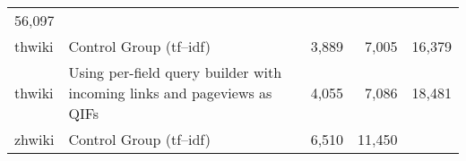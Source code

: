 \documentclass[12pt,]{article}
\begin{document}
\begin{longtable}[]{@{}llrrr@{}}
\begin{minipage}[t]{0.11\columnwidth}
56,097\strut
\end{minipage}\tabularnewline
\begin{minipage}[t]{0.07\columnwidth}\raggedright\strut
thwiki\strut
\end{minipage} & \begin{minipage}[t]{0.46\columnwidth}\raggedright\strut
Control Group (tf--idf)\strut
\end{minipage} & \begin{minipage}[t]{0.11\columnwidth}\raggedleft\strut
3,889\strut
\end{minipage} & \begin{minipage}[t]{0.12\columnwidth}\raggedleft\strut
7,005\strut
\end{minipage} & \begin{minipage}[t]{0.11\columnwidth}\raggedleft\strut
16,379\strut
\end{minipage}\tabularnewline
\begin{minipage}[t]{0.07\columnwidth}\raggedright\strut
thwiki\strut
\end{minipage} & \begin{minipage}[t]{0.46\columnwidth}\raggedright\strut
Using per-field query builder with incoming links and pageviews as
QIFs\strut
\end{minipage} & \begin{minipage}[t]{0.11\columnwidth}\raggedleft\strut
4,055\strut
\end{minipage} & \begin{minipage}[t]{0.12\columnwidth}\raggedleft\strut
7,086\strut
\end{minipage} & \begin{minipage}[t]{0.11\columnwidth}\raggedleft\strut
18,481\strut
\end{minipage}\tabularnewline
\begin{minipage}[t]{0.07\columnwidth}\raggedright\strut
zhwiki\strut
\end{minipage} & \begin{minipage}[t]{0.46\columnwidth}\raggedright\strut
Control Group (tf--idf)\strut
\end{minipage} & \begin{minipage}[t]{0.11\columnwidth}\raggedleft\strut
6,510\strut
\end{minipage} & \begin{minipage}[t]{0.12\columnwidth}\raggedleft\strut
11,450\strut
\end{minipage} & \begin{minipage}[t]{0.11\columnwidth}\raggedleft\strut

\end{minipage}
\end{longtable}
\end{document}
